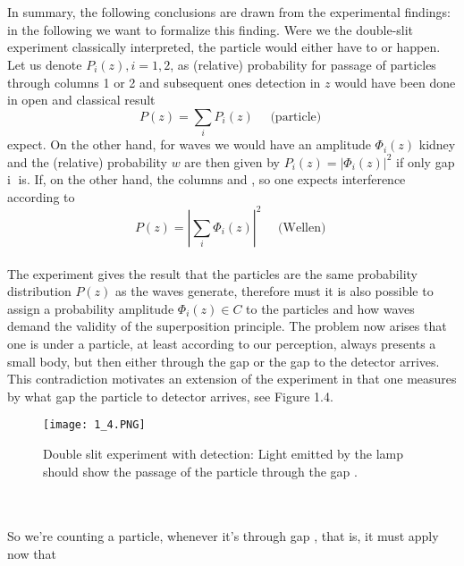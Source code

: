 \\ \\
In summary, the following conclusions are drawn from the experimental findings:
in the following we want to formalize this finding. Were we the double-slit experiment classically interpreted, the particle would either have to  or  happen. Let us denote $P_i(z), i = 1, 2$, as (relative) probability
for passage of particles through columns 1 or 2 and subsequent ones detection in $z$ would have been done in open  and  classical result
\\
\begin{equation}
P(z)=\sum_{i} P_{i}(z) \quad \text { (particle) }
\end{equation}
expect. On the other hand, for waves we would have an amplitude $\Phi_i(z)$ kidney and the (relative) probability $w$ are then given by
$P_i(z)=| \Phi_i(z) |^2$ if only gap
\textcircled{i} is. If, on the other hand, the columns  and , so one expects interference according to
\\
\begin{equation}
P(z)=\left|\sum_{i} \Phi_{i}(z)\right|^{2} \quad \text { (Wellen) }
\end{equation}\\
The experiment gives the result that the particles are the same probability distribution $P (z)$ as the waves generate, therefore must it is also possible to assign a probability amplitude $\Phi_i (z) \in C$ to the particles and how waves demand the validity of the superposition principle. The problem now arises that one is under a particle, at least according to our perception, always presents a small body, but then either through the gap  or  the gap to the detector arrives. This contradiction motivates an extension of the experiment in that one measures by what gap the particle to detector arrives, see Figure  1.4.
\begin{figure}[ht]
    \centering
    \texttt{[image: 1\_4.PNG]}
    \caption{Double slit experiment with detection: Light emitted by the lamp should show the passage of the particle through the gap .}
    \label{fig:1.4}
\end{figure}
\\ \\So we're counting a particle, whenever it's through gap , that is, it must apply now that
\\
